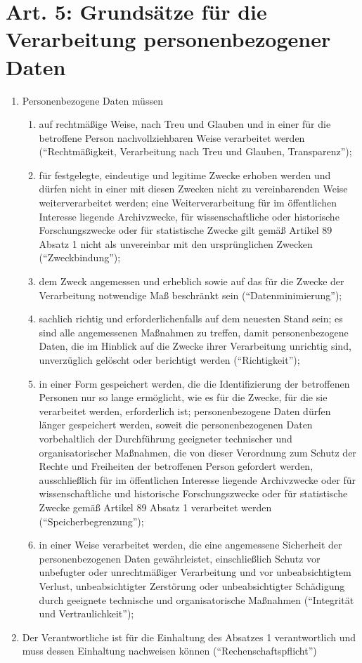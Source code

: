     \section{Art. 5: Grundsätze für die Verarbeitung personenbezogener Daten}
        \begin{enumerate}[label=(\arabic*)]
            \item Personenbezogene Daten müssen
                \begin{enumerate}[label=\alph*)]
                    \item auf rechtmäßige Weise, nach Treu und Glauben und in einer für die betroffene Person nachvollziehbaren Weise verarbeitet werden (``Rechtmäßigkeit, Verarbeitung nach Treu und Glauben, Transparenz'');
                    \item für festgelegte, eindeutige und legitime Zwecke erhoben werden und dürfen nicht in einer mit diesen Zwecken nicht zu vereinbarenden Weise weiterverarbeitet werden; eine Weiterverarbeitung für im öffentlichen Interesse liegende Archivzwecke, für wissenschaftliche oder historische Forschungszwecke oder für statistische Zwecke gilt gemäß Artikel 89 Absatz 1 nicht als unvereinbar mit den ursprünglichen Zwecken (``Zweckbindung'');
                    \item dem Zweck angemessen und erheblich sowie auf das für die Zwecke der Verarbeitung notwendige Maß beschränkt sein (``Datenminimierung''); 
                    \item sachlich richtig und erforderlichenfalls auf dem neuesten Stand sein; es sind alle angemessenen Maßnahmen zu treffen, damit personenbezogene Daten, die im Hinblick auf die Zwecke ihrer Verarbeitung unrichtig sind, unverzüglich gelöscht oder berichtigt werden (``Richtigkeit'');
                    \item in einer Form gespeichert werden, die die Identifizierung der betroffenen Personen nur so lange ermöglicht, wie es für die Zwecke, für die sie verarbeitet werden, erforderlich ist; personenbezogene Daten dürfen länger gespeichert werden, soweit die personenbezogenen Daten vorbehaltlich der Durchführung geeigneter technischer und organisatorischer Maßnahmen, die von dieser Verordnung zum Schutz der Rechte und Freiheiten der betroffenen Person gefordert werden, ausschließlich für im öffentlichen Interesse liegende Archivzwecke oder für wissenschaftliche und historische Forschungszwecke oder für statistische Zwecke gemäß Artikel 89 Absatz 1 verarbeitet werden (``Speicherbegrenzung'');
                    \item in einer Weise verarbeitet werden, die eine angemessene Sicherheit der personenbezogenen Daten gewährleistet, einschließlich Schutz vor unbefugter oder unrechtmäßiger Verarbeitung und vor unbeabsichtigtem Verlust, unbeabsichtigter Zerstörung oder unbeabsichtigter Schädigung durch geeignete technische und organisatorische Maßnahmen (``Integrität und Vertraulichkeit'');
                \end{enumerate}
            \item Der Verantwortliche ist für die Einhaltung des Absatzes 1 verantwortlich und muss dessen Einhaltung nachweisen können (``Rechenschaftspflicht'')
        \end{enumerate}
